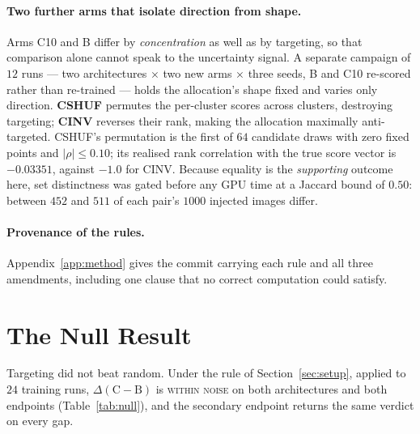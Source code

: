 \documentclass{article} %
\begin{document}
\paragraph{Two further arms that isolate direction from shape.} Arms C10 and B differ by
\emph{concentration} as well as by targeting, so that comparison alone cannot speak to the
uncertainty signal. A separate campaign of $12$ runs --- two architectures $\times$ two new arms
$\times$ three seeds, B and C10 re-scored rather than re-trained --- holds the allocation's shape
fixed and varies only direction. \textbf{CSHUF} permutes the per-cluster scores
across clusters, destroying targeting; \textbf{CINV} reverses their rank, making the allocation
maximally anti-targeted. CSHUF's permutation is the first of $64$ candidate draws with zero fixed points and
$|\rho| \leq 0.10$; its realised rank correlation with the true score vector is $-0.03351$, against
$-1.0$ for CINV. Because equality is the \emph{supporting} outcome here, set
distinctness was gated before any GPU time at a Jaccard bound of $0.50$: between $452$ and $511$ of
each pair's $1000$ injected images differ.

\paragraph{Provenance of the rules.} Appendix~\ref{app:method} gives the commit carrying each rule
and all three amendments, including one clause that no correct computation could satisfy.

\section{The Null Result}
\label{sec:null}

Targeting did not beat random. Under the rule of Section~\ref{sec:setup}, applied to $24$ training
runs, $\Delta(\mathrm{C}-\mathrm{B})$ is \textsc{within noise} on both architectures and both
endpoints (Table~\ref{tab:null}), and the secondary endpoint returns the same verdict on every
gap.
\end{document}
